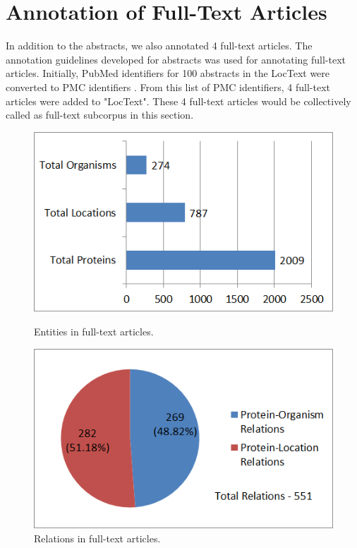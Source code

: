 \section{Annotation of Full-Text Articles} \label{sec:full-text}

In addition to the abstracts, we also annotated 4 full-text articles. The annotation guidelines developed for abstracts was used for annotating full-text articles. Initially, PubMed identifiers for 100 abstracts in the LocText were converted to PMC identifiers \cite{pubmedtopmc}. From this list of PMC identifiers, 4 full-text articles were added to "LocText". These 4 full-text articles would be collectively called as full-text subcorpus in this section.

\begin{figure}
\centering
\begin{minipage}{.5\textwidth}
  \centering
  \includegraphics[width=.95\textwidth]{figures/1_FullTextEntities.png}
  \caption{Entities in full-text articles.}
  \label{fig:FT_entities}
\end{minipage}%
\begin{minipage}{.5\textwidth}
  \centering
  \includegraphics[width=.95\textwidth]{figures/1_FullTextRelationDistribution.png}
  \caption{Relations in full-text articles.}
  \label{fig:FT_relations}
\end{minipage}
\end{figure}

